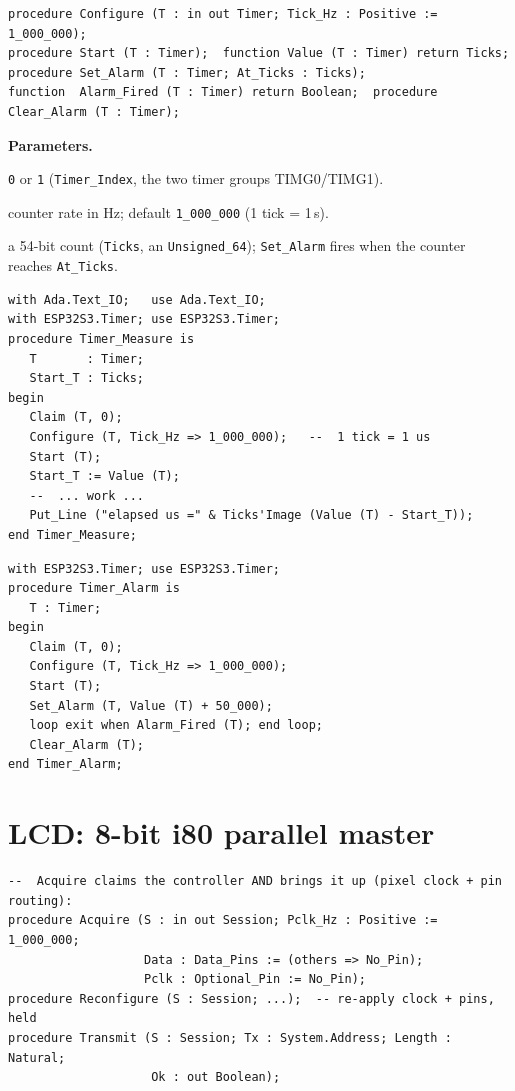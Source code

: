\begin{lstlisting}
procedure Configure (T : in out Timer; Tick_Hz : Positive := 1_000_000);
procedure Start (T : Timer);  function Value (T : Timer) return Ticks;
procedure Set_Alarm (T : Timer; At_Ticks : Ticks);
function  Alarm_Fired (T : Timer) return Boolean;  procedure Clear_Alarm (T : Timer);
\end{lstlisting}

\textbf{Parameters.}
\begin{description}[style=nextline]
\item[\texttt{Index}] \texttt{0} or \texttt{1} (\texttt{Timer\_Index}, the two
  timer groups TIMG0/TIMG1).
\item[\texttt{Tick\_Hz}] counter rate in Hz; default \texttt{1\_000\_000}
  (1 tick = 1\,\textmu s).
\item[\texttt{At\_Ticks} / \texttt{Value}] a 54-bit count (\texttt{Ticks}, an
  \texttt{Unsigned\_64}); \texttt{Set\_Alarm} fires when the counter reaches
  \texttt{At\_Ticks}.
\end{description}

\begin{lstlisting}
with Ada.Text_IO;   use Ada.Text_IO;
with ESP32S3.Timer; use ESP32S3.Timer;
procedure Timer_Measure is
   T       : Timer;
   Start_T : Ticks;
begin
   Claim (T, 0);
   Configure (T, Tick_Hz => 1_000_000);   --  1 tick = 1 us
   Start (T);
   Start_T := Value (T);
   --  ... work ...
   Put_Line ("elapsed us =" & Ticks'Image (Value (T) - Start_T));
end Timer_Measure;
\end{lstlisting}

\begin{lstlisting}
with ESP32S3.Timer; use ESP32S3.Timer;
procedure Timer_Alarm is
   T : Timer;
begin
   Claim (T, 0);
   Configure (T, Tick_Hz => 1_000_000);
   Start (T);
   Set_Alarm (T, Value (T) + 50_000);
   loop exit when Alarm_Fired (T); end loop;
   Clear_Alarm (T);
end Timer_Alarm;
\end{lstlisting}

\section{LCD: 8-bit i80 parallel master}

\begin{lstlisting}
--  Acquire claims the controller AND brings it up (pixel clock + pin routing):
procedure Acquire (S : in out Session; Pclk_Hz : Positive := 1_000_000;
                   Data : Data_Pins := (others => No_Pin);
                   Pclk : Optional_Pin := No_Pin);
procedure Reconfigure (S : Session; ...);  -- re-apply clock + pins, held
procedure Transmit (S : Session; Tx : System.Address; Length : Natural;
                    Ok : out Boolean);
\end{lstlisting}

